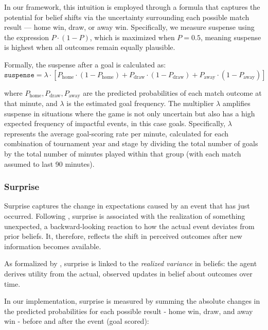\documentclass[11pt]{article}
\begin{document}
In our framework, this intuition is employed through a formula that captures the potential for belief shifts via the uncertainty surrounding each possible match result — home win, draw, or away win. Specifically, we measure suspense using the expression \( P \cdot (1 - P) \), which is maximized when \( P = 0.5 \), meaning suspense is highest when all outcomes remain equally plausible.

\vspace{0.5em}
Formally, the suspense after a goal is calculated as:\vspace{-0.5em}
\[
\texttt{suspense} = \lambda \cdot \left[ P_{\text{home}} \cdot (1 - P_{\text{home}}) + P_{\text{draw}} \cdot (1 - P_{\text{draw}}) + P_{\text{away}} \cdot (1 - P_{\text{away}}) \right]
\]

where \( P_{\text{home}}, P_{\text{draw}}, P_{\text{away}} \) are the predicted probabilities of each match outcome at that minute, and \( \lambda \) is the estimated goal frequency. The multiplier \( \lambda \) amplifies suspense in situations where the game is not only uncertain but also has a high expected frequency of impactful events, in this case goals. Specifically, \( \lambda \) represents the average goal-scoring rate per minute, calculated for each combination of tournament year and stage by dividing the total number of goals by the total number of minutes played within that group (with each match assumed to last 90 minutes).



\subsubsection*{Surprise}

Surprise captures the change in expectations caused by an event that has just occurred. Following \citet{bizzozero2016importance}, surprise is associated with the realization of something unexpected, a backward-looking reaction to how the actual event deviates from prior beliefs. It, therefore, reflects the shift in perceived outcomes after new information becomes available.

As formalized by \citet{ely2015suspense}, surprise is linked to the \textit{realized variance} in beliefs: the agent derives utility from the actual, observed updates in belief about outcomes over time. 

In our implementation, surprise is measured by summing the absolute changes in the predicted probabilities for each possible result - home win, draw, and away win - before and after the event (goal scored):
\end{document}
